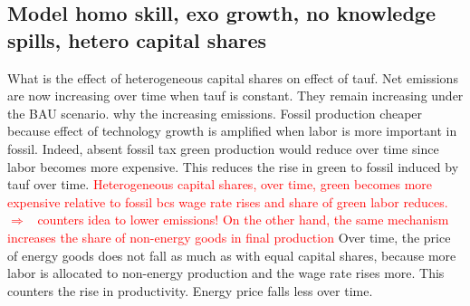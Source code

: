 \documentclass[12pt]{article}
\newcommand{\ar}{$\Rightarrow$ \ }
\newcommand{\tr}[1]{\textcolor{red}{#1}}
\begin{document}
\subsection{Model homo skill, exo growth, no knowledge spills, hetero capital shares}
What is the effect of heterogeneous capital shares on  effect of tauf. 
Net emissions are now increasing over time when tauf is constant. They remain increasing under the BAU scenario. why the increasing emissions. Fossil production cheaper because effect of technology growth is amplified when labor is more important in fossil. Indeed, absent fossil tax green production would reduce over time since labor becomes more expensive. This reduces the rise in green to fossil induced by tauf over time. \tr{Heterogeneous capital shares, over time, green becomes more expensive relative to fossil bcs wage rate rises and share of green labor reduces. \ar counters idea to lower emissions! On the other hand, the same mechanism increases the share of non-energy goods in final production }
Over time, the price of energy goods does not fall as much as with equal capital shares, because more labor is allocated to non-energy production and the wage rate rises more. This counters the rise in productivity. Energy price falls less over time. 
\end{document}
